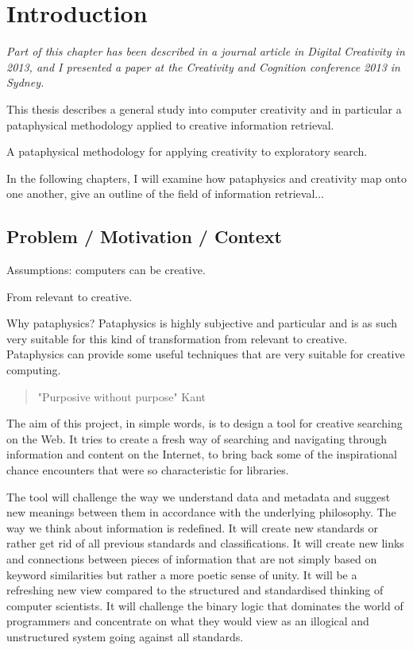 
\chapter{Introduction}
\label{ch:intro}

\emph{Part of this chapter has been described in a journal article in Digital Creativity in 2013, and I presented a paper at the Creativity and Cognition conference 2013 in Sydney.} 

\grule


This thesis describes a general study into computer creativity and in particular a pataphysical methodology applied to creative information retrieval.

A pataphysical methodology for applying creativity to exploratory search.


In the following chapters, I will examine how pataphysics and creativity map onto one another, give an outline of the field of information retrieval...

\section{Problem / Motivation / Context}

Assumptions: computers can be creative.

From relevant to creative.

Why pataphysics?
Pataphysics is highly subjective and particular and is as such very suitable for this kind of transformation from relevant to creative.
Pataphysics can provide some useful techniques that are very suitable for creative computing.

\begin{quote}
  "Purposive without purpose" Kant
\end{quote}

The aim of this project, in simple words, is to design a tool for creative searching on the Web. It tries to create a fresh way of searching and navigating through information and content on the Internet, to bring back some of the inspirational chance encounters that were so characteristic for libraries.

The tool will challenge the way we understand data and metadata and suggest new meanings between them in accordance with the underlying philosophy. The way we think about information is redefined. It will create new standards or rather get rid of all previous standards and classifications. It will create new links and connections between pieces of information that are not simply based on keyword similarities but rather a more poetic sense of unity. It will be a refreshing new view compared to the structured and standardised thinking of computer scientists. It will challenge the binary logic that dominates the world of programmers and concentrate on what they would view as an illogical and unstructured system going against all standards.

